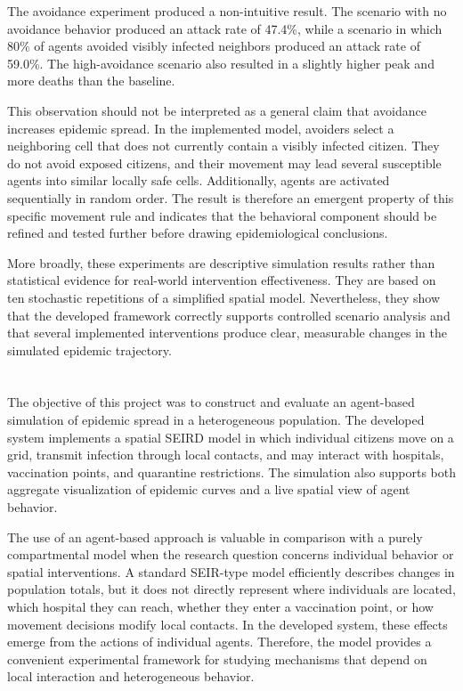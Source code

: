 \documentclass[english]{projectreport}
\begin{document}
The avoidance experiment produced a non-intuitive result. The scenario
with no avoidance behavior produced an attack rate of 47.4\%, while a
scenario in which 80\% of agents avoided visibly infected neighbors
produced an attack rate of 59.0\%. The high-avoidance scenario also
resulted in a slightly higher peak and more deaths than the baseline.

This observation should not be interpreted as a general claim that
avoidance increases epidemic spread. In the implemented model, avoiders
select a neighboring cell that does not currently contain a visibly
infected citizen. They do not avoid exposed citizens, and their movement
may lead several susceptible agents into similar locally safe cells.
Additionally, agents are activated sequentially in random order. The
result is therefore an emergent property of this specific movement rule
and indicates that the behavioral component should be refined and tested
further before drawing epidemiological conclusions.

More broadly, these experiments are descriptive simulation results rather
than statistical evidence for real-world intervention effectiveness. They
are based on ten stochastic repetitions of a simplified spatial model.
Nevertheless, they show that the developed framework correctly supports
controlled scenario analysis and that several implemented interventions
produce clear, measurable changes in the simulated epidemic trajectory.

\clearpage


\section{\SectionTitleSummary}
\label{sec:conclusions}

The objective of this project was to construct and evaluate an
agent-based simulation of epidemic spread in a heterogeneous population.
The developed system implements a spatial SEIRD model in which individual
citizens move on a grid, transmit infection through local contacts, and
may interact with hospitals, vaccination points, and quarantine
restrictions. The simulation also supports both aggregate visualization
of epidemic curves and a live spatial view of agent behavior.

The use of an agent-based approach is valuable in comparison with a
purely compartmental model when the research question concerns individual
behavior or spatial interventions. A standard SEIR-type model efficiently
describes changes in population totals, but it does not directly represent
where individuals are located, which hospital they can reach, whether
they enter a vaccination point, or how movement decisions modify local
contacts. In the developed system, these effects emerge from the actions
of individual agents. Therefore, the model provides a convenient
experimental framework for studying mechanisms that depend on local
interaction and heterogeneous behavior.
\end{document}
